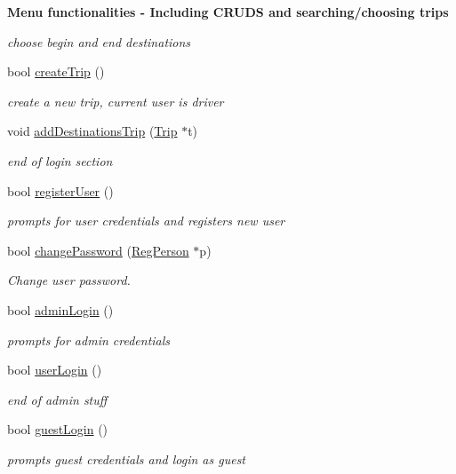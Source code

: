 \begin{Indent}{\bf Menu functionalities -\/ Including C\+R\+U\+D\+S and searching/choosing trips}
\begin{DoxyCompactItemize}
\begin{DoxyCompactList}\small\item\em choose begin and end destinations \end{DoxyCompactList}\item 
bool \hyperlink{class_lyfter_a7ee30f5ef911aa0348fa3485b8164ba5}{create\+Trip} ()
\begin{DoxyCompactList}\small\item\em create a new trip, current user is driver \end{DoxyCompactList}\item 
void \hyperlink{class_lyfter_ad2ecd0bcf3ddd27c1a5626b0d861da9d}{add\+Destinations\+Trip} (\hyperlink{class_trip}{Trip} $\ast$t)
\begin{DoxyCompactList}\small\item\em end of login section \end{DoxyCompactList}\item 
bool \hyperlink{class_lyfter_a6bafddb8f1f0454760043680b6bdf335}{register\+User} ()
\begin{DoxyCompactList}\small\item\em prompts for user credentials and registers new user \end{DoxyCompactList}\item 
bool \hyperlink{class_lyfter_a89a0f7a32777dc12037a70daac106c94}{change\+Password} (\hyperlink{class_reg_person}{Reg\+Person} $\ast$p)
\begin{DoxyCompactList}\small\item\em Change user password. \end{DoxyCompactList}\item 
bool \hyperlink{class_lyfter_a15872daf41782dbb38de3e29ea95204b}{admin\+Login} ()
\begin{DoxyCompactList}\small\item\em prompts for admin credentials \end{DoxyCompactList}\item 
bool \hyperlink{class_lyfter_a04520c7df207c976a1aa4e15800ef601}{user\+Login} ()
\begin{DoxyCompactList}\small\item\em end of admin stuff \end{DoxyCompactList}\item 
bool \hyperlink{class_lyfter_a897b495004f661b50fe2d7951998db94}{guest\+Login} ()
\begin{DoxyCompactList}\small\item\em prompts guest credentials and login as guest \end{DoxyCompactList}\item 

\end{DoxyCompactItemize}
\end{Indent}
